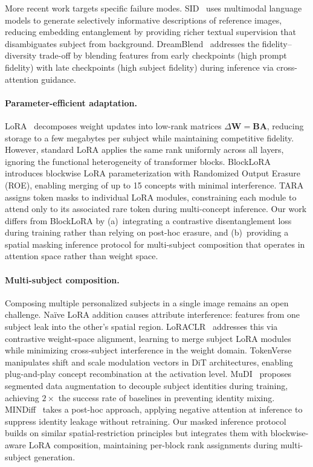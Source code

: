 \documentclass{article}
\begin{document}
More recent work targets specific failure modes.
SID~\citep{sid2024} uses multimodal language models to generate selectively informative descriptions of reference images, reducing embedding entanglement by providing richer textual supervision that disambiguates subject from background.
DreamBlend~\citep{dreamblend2025} addresses the fidelity--diversity trade-off by blending features from early checkpoints (high prompt fidelity) with late checkpoints (high subject fidelity) during inference via cross-attention guidance.

\paragraph{Parameter-efficient adaptation.}
LoRA~\citep{hu2022lora} decomposes weight updates into low-rank matrices $\Delta\mathbf{W} = \mathbf{B}\mathbf{A}$, reducing storage to a few megabytes per subject while maintaining competitive fidelity.
However, standard LoRA applies the same rank uniformly across all layers, ignoring the functional heterogeneity of transformer blocks.
BlockLoRA~\citep{zhu2025blocklora} introduces blockwise LoRA parameterization with Randomized Output Erasure (ROE), enabling merging of up to 15 concepts with minimal interference.
TARA~\citep{tara2026} assigns token masks to individual LoRA modules, constraining each module to attend only to its associated rare token during multi-concept inference.
Our work differs from BlockLoRA by (a)~integrating a contrastive disentanglement loss during training rather than relying on post-hoc erasure, and (b)~providing a spatial masking inference protocol for multi-subject composition that operates in attention space rather than weight space.

\paragraph{Multi-subject composition.}
Composing multiple personalized subjects in a single image remains an open challenge.
Na\"ive LoRA addition causes attribute interference: features from one subject leak into the other's spatial region.
LoRACLR~\citep{loraclr2025} addresses this via contrastive weight-space alignment, learning to merge subject LoRA modules while minimizing cross-subject interference in the weight domain.
TokenVerse~\citep{tokenverse2025} manipulates shift and scale modulation vectors in DiT architectures, enabling plug-and-play concept recombination at the activation level.
MuDI~\citep{mudi2024} proposes segmented data augmentation to decouple subject identities during training, achieving $2\times$ the success rate of baselines in preventing identity mixing.
MINDiff~\citep{mindiff2025} takes a post-hoc approach, applying negative attention at inference to suppress identity leakage without retraining.
Our masked inference protocol builds on similar spatial-restriction principles but integrates them with blockwise-aware LoRA composition, maintaining per-block rank assignments during multi-subject generation.
\end{document}
